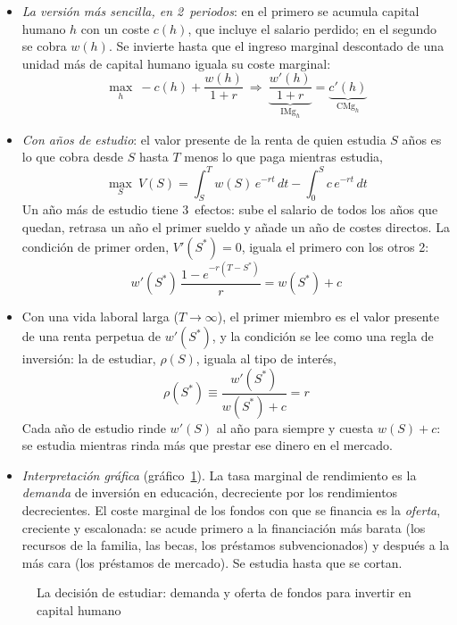 \documentclass[11pt]{article}
\begin{document}
\begin{itemize}
\item \emph{La versión más sencilla, en 2~periodos}: en el primero se acumula capital humano $h$ con un coste $c(h)$, que incluye el salario perdido; en el segundo se cobra $w(h)$. Se invierte hasta que el ingreso marginal descontado de una unidad más de capital humano iguala su coste marginal:
  \begin{equation}
  \max_{h}\ -c(h)+\frac{w(h)}{1+r}\ \Longrightarrow\ \underbrace{\frac{w'(h)}{1+r}}_{\mathrm{IMg}_h}=\underbrace{c'(h)}_{\mathrm{CMg}_h}\label{eq:becker-inversion}
  \end{equation}
\item \emph{Con años de estudio}: el valor presente de la renta de quien estudia $S$ años es lo que cobra desde $S$ hasta $T$ menos lo que paga mientras estudia,
  \[
  \max_{S}\ V(S)=\int_{S}^{T}w(S)\,e^{-rt}\,dt-\int_{0}^{S}c\,e^{-rt}\,dt
  \]
  Un año más de estudio tiene 3~efectos: sube el salario de todos los años que quedan, retrasa un año el primer sueldo y añade un año de costes directos. La condición de primer orden, $V'(S^*)=0$, iguala el primero con los otros 2:
  \[
  w'(S^*)\,\frac{1-e^{-r(T-S^*)}}{r}=w(S^*)+c
  \]
\item Con una vida laboral larga ($T\to\infty$), el primer miembro es el valor presente de una renta perpetua de $w'(S^*)$, y la condición se lee como una regla de inversión: la  de estudiar, $\rho(S)$, iguala al tipo de interés,
  \[
  \rho(S^*)\equiv\frac{w'(S^*)}{w(S^*)+c}=r
  \]
  Cada año de estudio rinde $w'(S)$ al año para siempre y cuesta $w(S)+c$: se estudia mientras rinda más que prestar ese dinero en el mercado.
\item \emph{Interpretación gráfica}\nocite{Becker1967Human} (gráfico~\ref{fig:becker-inversion}). La tasa marginal de rendimiento es la \emph{demanda} de inversión en educación, decreciente por los rendimientos decrecientes. El coste marginal de los fondos con que se financia es la \emph{oferta}, creciente y escalonada: se acude primero a la financiación más barata (los recursos de la familia, las becas, los préstamos subvencionados) y después a la más cara (los préstamos de mercado). Se estudia hasta que se cortan.
\end{itemize}

\begin{figure}[H]
\centering
\caption{La decisión de estudiar: demanda y oferta de fondos para invertir en capital humano}\label{fig:becker-inversion}
\end{figure}
\end{document}
